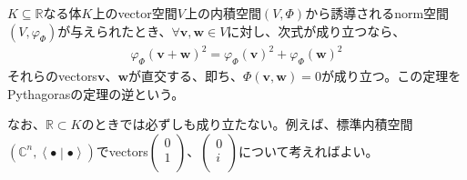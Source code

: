 \documentclass[dvipdfmx]{jsarticle}
\begin{document}
\begin{thm}[Pythagorasの定理の逆]\label{2.3.6.14}
$K \subseteq \mathbb{R}$なる体$K$上のvector空間$V$上の内積空間$(V,\varPhi)$から誘導されるnorm空間$\left( V,\varphi_{\varPhi} \right)$が与えられたとき、$\forall\mathbf{v},\mathbf{w} \in V$に対し、次式が成り立つなら、
\begin{align*}
{\varphi_{\varPhi}\left( \mathbf{v} + \mathbf{w} \right)}^{2} = {\varphi_{\varPhi}\left( \mathbf{v} \right)}^{2} + {\varphi_{\varPhi}\left( \mathbf{w} \right)}^{2}
\end{align*}
それらのvectors$\mathbf{v}$、$\mathbf{w}$が直交する、即ち、$\varPhi\left( \mathbf{v},\mathbf{w} \right) = 0$が成り立つ。この定理をPythagorasの定理の逆という。
\end{thm}\par
なお、$\mathbb{R} \subset K$のときでは必ずしも成り立たない。例えば、標準内積空間$\left( \mathbb{C}^{n},\left\langle \bullet \middle| \bullet \right\rangle \right)$でvectors$\begin{pmatrix}
0 \\
1 \\
\end{pmatrix}$、$\begin{pmatrix}
0 \\
i \\
\end{pmatrix}$について考えればよい。
\end{document}
